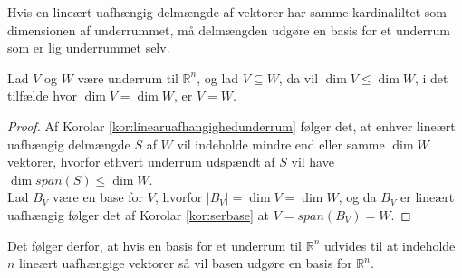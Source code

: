 Hvis en lineært uafhængig delmængde af vektorer har samme kardinaliltet som dimensionen af underrummet, må delmængden udgøre en basis for et underrum som er lig underrummet selv.
\begin{stn}
Lad $V$ og $W$ være underrum til $\mathds{R}^n$, og lad $V \subseteq W$, da vil $\dim{V} \leq \dim{W}$, i det tilfælde hvor $\dim{V}=\dim{W}$, er $V=W$.
\label{stn:dimunderrum}
\end{stn}
\begin{proof}
Af Korolar \ref{kor:linearuafhangighedunderrum} følger det, at enhver lineært uafhængig delmængde $S$ af $W$ vil indeholde mindre end eller samme $\dim{W}$ vektorer, hvorfor ethvert underrum udspændt af $S$ vil have $\dim{span(S)} \leq \dim{W}$.
\\%
Lad $B_V$ være en base for $V$, hvorfor $|B_V| = \dim{V} = \dim{W}$, og da $B_V$ er lineært uafhængig følger det af Korolar \ref{kor:serbase} at $V = span(B_V) = W$.
\end{proof}
Det følger derfor, at hvis en basis for et underrum til $\mathds{R}^n$ udvides til at indeholde $n$ lineært uafhængige vektorer så vil basen udgøre en basis for $\mathds{R}^n$.
